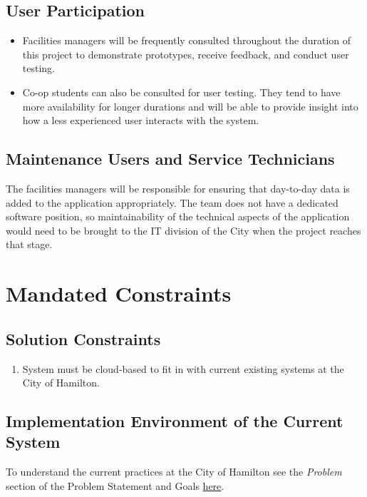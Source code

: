 \documentclass[12pt]{article}
\begin{document}
\subsection{User Participation}

\begin{itemize}
    \item Facilities managers will be frequently consulted throughout the 
    duration of this project to demonstrate prototypes, receive feedback, 
    and conduct user testing.
    \item Co-op students can also be consulted for user testing.
    They tend to have more availability for longer durations and will be able
    to provide insight into how a less experienced user interacts with the 
    system.

\end{itemize}
\subsection{Maintenance Users and Service Technicians}
The facilities managers will be responsible for ensuring that day-to-day data 
is added to the application appropriately. The team does not have a dedicated
software position, so maintainability of the technical aspects of the 
application would need to be brought to the IT division of the City
when the project reaches that stage.

\section{Mandated Constraints}
\subsection{Solution Constraints}
\begin{enumerate} [{C-SOL}1.]
  \item System must be cloud-based to fit in with current existing systems at
  the City of Hamilton.
\end{enumerate}

\subsection{Implementation Environment of the Current System}
To understand the current practices at the City of Hamilton see the
\textit{Problem} section of the Problem Statement and Goals
\href{https://github.com/Spitgranger/capstone/blob/main/docs/ProblemStatementAndGoals/ProblemStatement.md#11-problem}
{here}.
\end{document}
